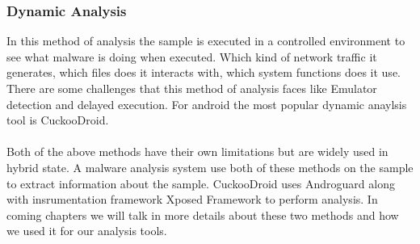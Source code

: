 \documentclass[../main.tex]{subfile}
\begin{document}
		\subsubsection[Dynamic Analysis]{Dynamic Analysis} In this method of analysis the sample is executed in a controlled environment to see what malware is doing when executed. Which kind of network traffic it generates, which files does it interacts with, which system functions does it use. There are some challenges that this method of analysis faces like Emulator detection and delayed execution. For android the most popular dynamic anaylsis tool is CuckooDroid. 
		
		\paragraph{} Both of the above methods have their own limitations but are widely used in hybrid state. A malware analysis system use both of these methods on the sample to extract information about the sample. CuckooDroid uses Androguard along with insrumentation framework Xposed Framework to perform analysis. In coming chapters we will talk in more details about these two methods and how we used it for our analysis tools. 
		
		
\end{document}
